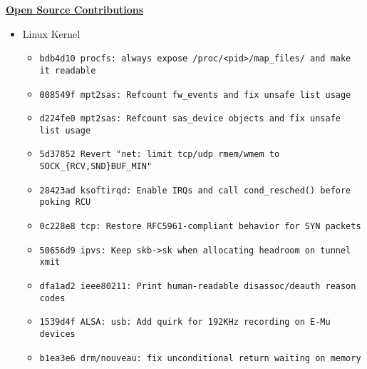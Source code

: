 \documentclass[11pt]{article}
\begin{document}
\centerline{\underline{\bf Open Source Contributions}}
\begin{itemize}[leftmargin=*]
\itemsep 0em
	\item Linux Kernel
	\begin{itemize}
	\itemsep 0em
		\item \begin{verbatim}bdb4d10 procfs: always expose /proc/<pid>/map_files/ and make it readable\end{verbatim}
		\item \begin{verbatim}008549f mpt2sas: Refcount fw_events and fix unsafe list usage\end{verbatim}
		\item \begin{verbatim}d224fe0 mpt2sas: Refcount sas_device objects and fix unsafe list usage\end{verbatim}
		\item \begin{verbatim}5d37852 Revert "net: limit tcp/udp rmem/wmem to SOCK_{RCV,SND}BUF_MIN"\end{verbatim}
		\item \begin{verbatim}28423ad ksoftirqd: Enable IRQs and call cond_resched() before poking RCU\end{verbatim}
		\item \begin{verbatim}0c228e8 tcp: Restore RFC5961-compliant behavior for SYN packets\end{verbatim}
		\item \begin{verbatim}50656d9 ipvs: Keep skb->sk when allocating headroom on tunnel xmit\end{verbatim}
		\item \begin{verbatim}dfa1ad2 ieee80211: Print human-readable disassoc/deauth reason codes\end{verbatim}
		\item \begin{verbatim}1539d4f ALSA: usb: Add quirk for 192KHz recording on E-Mu devices\end{verbatim}
		\item \begin{verbatim}b1ea3e6 drm/nouveau: fix unconditional return waiting on memory\end{verbatim}
	\end{itemize}
\end{itemize}
\end{document}
